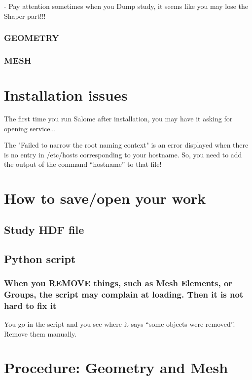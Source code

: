 \documentclass[10pt]{book}
\begin{document}
 - Pay attention sometimes when you Dump study, it seems like you may lose the Shaper part!!!  
   
 \subsection{GEOMETRY}
 

 \subsection{MESH}

 
\chapter{Installation issues}

  The first time you run Salome after installation,
  you may have it asking for opening service...

The "Failed to narrow the root naming context" 
is an error displayed when there is no entry in /etc/hosts 
corresponding to your hostname. So, you need to add the output of the command
 ``hostname'' to that file!

\chapter{How to save/open your work}

  \section{Study HDF file}

  
  \section{Python script}

  
    \subsection{When you REMOVE things, such as Mesh Elements, or Groups, the script may complain at loading. Then it is not hard to fix it}
    
    
    You go in the script and you see where it says ``some objects were removed''.
    Remove them manually.
  
  
  
  
 \chapter{Procedure: Geometry and Mesh}
\end{document}
